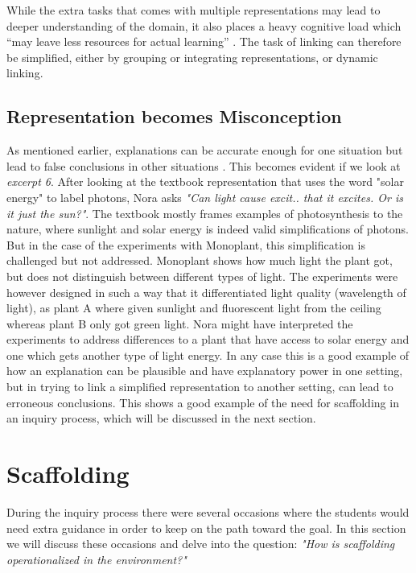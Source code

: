 While the extra tasks that comes with multiple representations may lead to deeper understanding of the domain, it also places a heavy cognitive load which “may leave less resources for actual learning” \citetext{Sweller, 1988, 1989, referenced in \citealp{van2006supporting}}. The task of linking can therefore be simplified, either by grouping or integrating representations, or dynamic linking. 

\subsection{Representation becomes Misconception}
As mentioned earlier, explanations can be accurate enough for one situation but lead to false conclusions in other situations \citep{smith1994misconceptions}. This becomes evident if we look at \emph{excerpt 6}. After looking at the textbook representation that uses the word "solar energy" to label photons, Nora asks \emph{"Can light cause excit.. that it excites. Or is it just the sun?"}. The textbook mostly frames examples of photosynthesis to the nature, where sunlight and solar energy is indeed valid simplifications of photons. But in the case of the experiments with Monoplant, this simplification is challenged but not addressed. Monoplant shows how much light the plant got, but does not distinguish between different types of light. The experiments were however designed in such a way that it differentiated light quality (wavelength of light), as plant A where given sunlight and fluorescent light from the ceiling whereas plant B only got green light. Nora might have interpreted the experiments to address differences to a plant that have access to solar energy and one which gets another type of light energy. In any case this is a good example of how an explanation can be plausible and have explanatory power in one setting, but in trying to link a simplified representation to another  setting, can lead to erroneous conclusions. This shows a good example of the need for scaffolding in an inquiry process, which will be discussed in the next section.

\section{Scaffolding}
During the inquiry process there were several occasions where the students would need extra guidance in order to keep on the path toward the goal. In this section we will discuss these occasions and delve into the question: \emph{"How is scaffolding operationalized in the environment?"}

